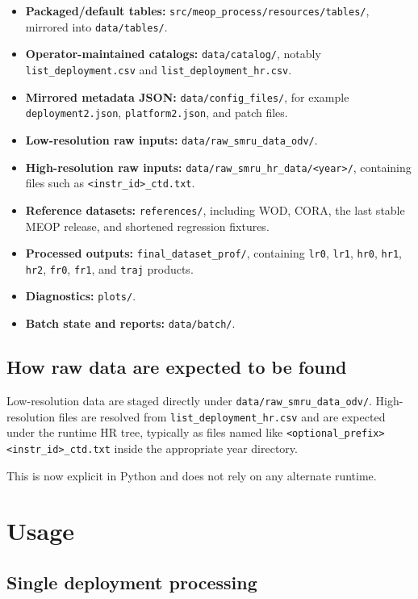 \documentclass[11pt,a4paper]{article}
\newcommand{\pkg}[1]{\texttt{#1}}
\begin{document}
\begin{itemize}[leftmargin=1.5em]
  \item \textbf{Packaged/default tables:} \pkg{src/meop\_process/resources/tables/}, mirrored into \pkg{data/tables/}.
  \item \textbf{Operator-maintained catalogs:} \pkg{data/catalog/}, notably \pkg{list\_deployment.csv} and \pkg{list\_deployment\_hr.csv}.
  \item \textbf{Mirrored metadata JSON:} \pkg{data/config\_files/}, for example \pkg{deployment2.json}, \pkg{platform2.json}, and patch files.
  \item \textbf{Low-resolution raw inputs:} \pkg{data/raw\_smru\_data\_odv/}.
  \item \textbf{High-resolution raw inputs:} \pkg{data/raw\_smru\_hr\_data/<year>/}, containing files such as \pkg{<instr\_id>\_ctd.txt}.
  \item \textbf{Reference datasets:} \pkg{references/}, including WOD, CORA, the last stable MEOP release, and shortened regression fixtures.
  \item \textbf{Processed outputs:} \pkg{final\_dataset\_prof/}, containing \pkg{lr0}, \pkg{lr1}, \pkg{hr0}, \pkg{hr1}, \pkg{hr2}, \pkg{fr0}, \pkg{fr1}, and \pkg{traj} products.
  \item \textbf{Diagnostics:} \pkg{plots/}.
  \item \textbf{Batch state and reports:} \pkg{data/batch/}.
\end{itemize}

\subsection{How raw data are expected to be found}

Low-resolution data are staged directly under \pkg{data/raw\_smru\_data\_odv/}. High-resolution files are resolved from \pkg{list\_deployment\_hr.csv} and are expected under the runtime HR tree, typically as files named like \pkg{<optional\_prefix><instr\_id>\_ctd.txt} inside the appropriate year directory.

This is now explicit in Python and does not rely on any alternate runtime.

\section{Usage}

\subsection{Single deployment processing}
\end{document}
